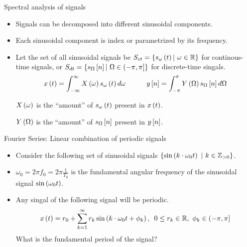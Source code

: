 \documentclass[aspectratio=169]{beamer}
\let\olditem\item
\renewcommand{\item}{\setlength{\itemsep}{\fill}\olditem}
\def\mb{\ensuremath\mathbb}
\def\lp{\ensuremath\left(}
\def\rp{\ensuremath\right)}
\def\ls{\ensuremath\left[}
\def\rs{\ensuremath\right]}
\begin{document}
\begin{frame}[t]{Spectral analysis of signals}
  \begin{itemize}
    \item Signals can be decomposed into different sinusoidal components.

    \item Each sinusoidal component is index or parametrized by its frequency.

    \item Let the set of all sinusoidal signals be $S_{ct} = \left\{ s_{\omega}\lp t \rp \vert \,\, \omega \in \mb{R} \right\}$ for continous-time signals, or $S_{dt} = \left\{ s_{\Omega}\ls n \rs \vert \,\, \Omega \in \left( -\pi , \pi\right] \right\}$ for discrete-time singals.
    \[ x\lp t \rp = \int_{-\infty}^{\infty} X\lp \omega \rp s_\omega\lp t \rp d\omega \quad \quad \quad y\ls n \rs = \int_{-\pi}^{\pi} Y\lp \Omega \rp s_\Omega\ls n \rs d\Omega \]

    $X\lp \omega \rp$ is the ``amount'' of $s_{\omega}\lp t \rp$ present in $x\lp t \rp$.

    $Y\lp \Omega \rp$ is the ``amount'' of $s_{\Omega}\ls n \rs$ present in $y\ls n \rs$.    
  \end{itemize}
\end{frame}


\begin{frame}[t]{Fourier Series: Linear combination of periodic signals}
\begin{itemize}
  \item Consider the following set of sinusoidal signals $\left\{ \sin\lp k\cdot \omega_0 t\rp \,\, \vert \,\, k \in \mb{Z}_{>0} \right\}$.
  
  \item $\omega_0 = 2 \pi f_0 = 2\pi\frac{1}{T_0}$ is the fundamental angular frequency of the sinusoidal signal $\sin \lp \omega_0 t \rp$.

  \item Any singal of the following signal will be periodic.
  \[ x\lp t \rp = r_0 + \sum_{k=1}^{\infty} r_k \sin\lp k\cdot \omega_0 t + \phi_k \rp, \,\,\, 0 \leq r_k \in \mb{R}, \,\, \phi_k \in \lp -\pi, \pi \rs \]
  \vspace{0.25cm}
  What is the fundamental period of the signal?
\end{itemize}
\end{frame}
\end{document}
